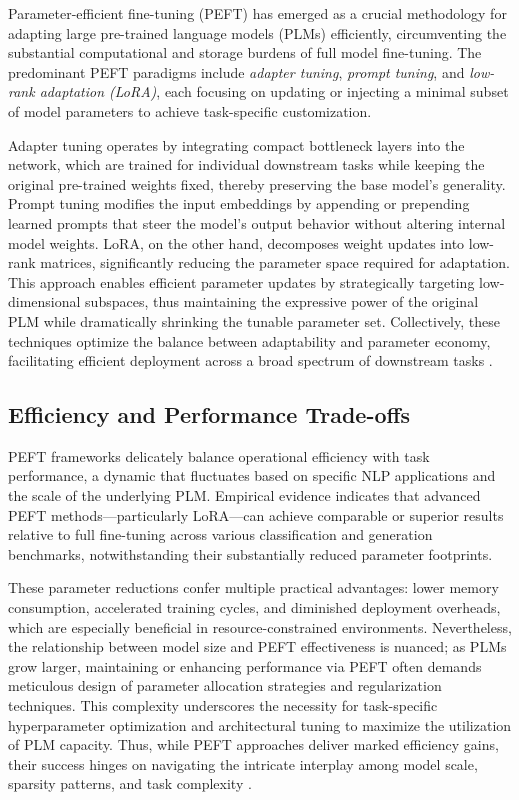 \documentclass[11pt]{article}
\begin{document}
Parameter-efficient fine-tuning (PEFT) has emerged as a crucial methodology for adapting large pre-trained language models (PLMs) efficiently, circumventing the substantial computational and storage burdens of full model fine-tuning. The predominant PEFT paradigms include \textit{adapter tuning}, \textit{prompt tuning}, and \textit{low-rank adaptation (LoRA)}, each focusing on updating or injecting a minimal subset of model parameters to achieve task-specific customization. 

Adapter tuning operates by integrating compact bottleneck layers into the network, which are trained for individual downstream tasks while keeping the original pre-trained weights fixed, thereby preserving the base model’s generality. Prompt tuning modifies the input embeddings by appending or prepending learned prompts that steer the model’s output behavior without altering internal model weights. LoRA, on the other hand, decomposes weight updates into low-rank matrices, significantly reducing the parameter space required for adaptation. This approach enables efficient parameter updates by strategically targeting low-dimensional subspaces, thus maintaining the expressive power of the original PLM while dramatically shrinking the tunable parameter set. Collectively, these techniques optimize the balance between adaptability and parameter economy, facilitating efficient deployment across a broad spectrum of downstream tasks \cite{ref48}.

\subsection{Efficiency and Performance Trade-offs}

PEFT frameworks delicately balance operational efficiency with task performance, a dynamic that fluctuates based on specific NLP applications and the scale of the underlying PLM. Empirical evidence indicates that advanced PEFT methods—particularly LoRA—can achieve comparable or superior results relative to full fine-tuning across various classification and generation benchmarks, notwithstanding their substantially reduced parameter footprints. 

These parameter reductions confer multiple practical advantages: lower memory consumption, accelerated training cycles, and diminished deployment overheads, which are especially beneficial in resource-constrained environments. Nevertheless, the relationship between model size and PEFT effectiveness is nuanced; as PLMs grow larger, maintaining or enhancing performance via PEFT often demands meticulous design of parameter allocation strategies and regularization techniques. This complexity underscores the necessity for task-specific hyperparameter optimization and architectural tuning to maximize the utilization of PLM capacity. Thus, while PEFT approaches deliver marked efficiency gains, their success hinges on navigating the intricate interplay among model scale, sparsity patterns, and task complexity \cite{ref48}.
\end{document}
